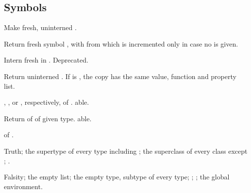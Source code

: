 \subsection{Symbols}
\begin{LIST}{1cm}

  {
  Make fresh, uninterned .
  }

  {
  Return fresh symbol , with  from
   which is incremented only in case no 
  is given. 
  }

  {
  Intern fresh  in . Deprecated.
  }

  {
  Return uninterned . If  is
  \T, the copy has the same value, function and property list.
  }

  {
  , , or , respectively,
  of . able. 
  }

  {
  Return  of  of given
  type. \-able. 
  }

  {
   of .
  }

  {
  Truth; the supertype of every type including ; the superclass of every
  class except ; .
  }

  {
  Falsity; the empty list; the empty type, subtype of every type; ;
  ; the global environment.
  }

\end{LIST}


